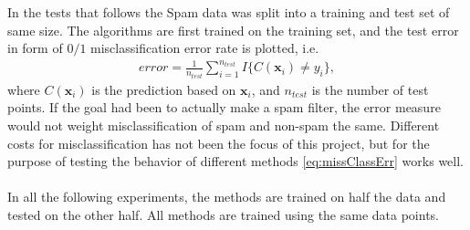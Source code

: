  In the tests that follows the Spam data was split into a training and test set of same size. The algorithms are first trained on the training set, and the test error in form of $0/1$ misclassification error rate is plotted, i.e.
 \begin{align}
   \label{eq:missClassErr} 
   error =  \frac{1}{n_{test}} \sum_{i = 1}^{n_{test}} I\{C(\mathbf{x}_i) \neq y_i\},
 \end{align}
 where $C(\mathbf{x}_i)$ is the prediction based on $\mathbf{x}_i$, and $n_{test}$ is the number of test points. If the goal had been to actually make a spam filter, the error measure would not weight misclassification of spam and non-spam the same. Different costs for misclassification has not been the focus of this project, but for the purpose of testing the behavior of different methods \eqref{eq:missClassErr} works well.
\\ 
\\
In all the following experiments, the methods are trained on half the data and tested on the other half. All methods are trained using the same data points. 

